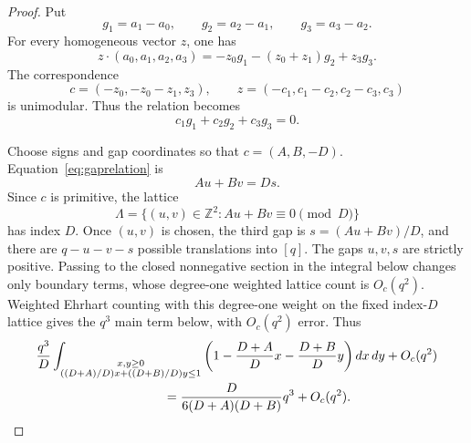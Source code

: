 \documentclass[11pt,reqno]{amsart}
\theoremstyle{definition}
\theoremstyle{remark}
\begin{document}
\begin{proof}
Put
\[
 g_1=a_1-a_0,\qquad g_2=a_2-a_1,\qquad g_3=a_3-a_2.
\]
For every homogeneous vector $z$, one has
\[
 z\cdot(a_0,a_1,a_2,a_3)
 =-z_0g_1-(z_0+z_1)g_2+z_3g_3.
\]
The correspondence
\[
 c=(-z_0,-z_0-z_1,z_3),\qquad
 z=(-c_1,c_1-c_2,c_2-c_3,c_3)
\]
is unimodular.  Thus the relation becomes
\begin{equation}\label{eq:gaprelation}
 c_1g_1+c_2g_2+c_3g_3=0.
\end{equation}

Choose signs and gap coordinates so that $c=(A,B,-D)$.
Equation~\eqref{eq:gaprelation} is
\[
 Au+Bv=Ds.
\]
Since $c$ is primitive, the lattice
\[
 \Lambda=\{(u,v)\in\mathbb Z^2:Au+Bv\equiv0\pmod D\}
\]
has index $D$.  Once $(u,v)$ is chosen, the third gap is
$s=(Au+Bv)/D$, and there are $q-u-v-s$ possible translations into
$[q]$.  The gaps $u,v,s$ are strictly positive.  Passing to the closed
nonnegative section in the integral below changes only boundary terms, whose
degree-one weighted lattice count is $O_c(q^2)$.  Weighted Ehrhart counting
with this degree-one weight on the fixed index-$D$ lattice gives the $q^3$
main term below, with $O_c(q^2)$ error.  Thus
\begin{align*}
 &\frac{q^3}{D}
 \int_{\substack{x,y\geq0\\
 ((D+A)/D)x+((D+B)/D)y\leq1}}
 \left(1-\frac{D+A}{D}x-\frac{D+B}{D}y\right)dx\,dy
 +O_c(q^2)\\
 &\hspace{35mm}=
 \frac{D}{6(D+A)(D+B)}q^3+O_c(q^2).
\end{align*}
\end{proof}
\end{document}

